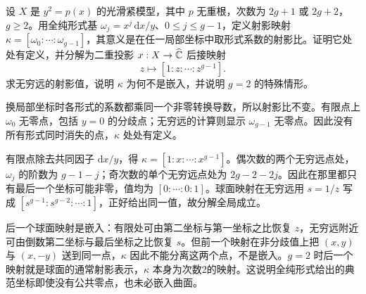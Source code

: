 \begin{exercise}\label{b3:ex:A-4}
设 \(X\) 是 \(y^2=p(x)\) 的光滑紧模型，其中 \(p\) 无重根，次数为 \(2g+1\) 或 \(2g+2\)，\(g\ge2\)。用全纯形式基 \(\omega_j=x^j\,\mathrm{d}x/y\)、\(0\le j\le g-1\)，定义射影映射 \(\kappa=[\omega_0:\cdots:\omega_{g-1}]\)，其意义是在任一局部坐标中取形式系数的射影比。证明它处处有定义，并分解为二重投影 \(x:X\rightarrow\widehat{\mathbb C\kern0pt}\) 后接映射
\[
 z\longmapsto[1:z:\cdots:z^{g-1}].
\]
求无穷远的射影值，说明 \(\kappa\) 为何不是嵌入，并说明 \(g=2\) 的特殊情形。
\end{exercise}
\begin{solution}
换局部坐标时各形式的系数都乘同一个非零转换导数，所以射影比不变。有限点上 \(\omega_0\) 无零点，包括 \(y=0\) 的分歧点；无穷远的计算则显示 \(\omega_{g-1}\) 无零点。因此没有所有形式同时消失的点，\(\kappa\) 处处有定义。

有限点除去共同因子 \(\mathrm{d}x/y\)，得 \(\kappa=[1:x:\cdots:x^{g-1}]\)。偶次数的两个无穷远点处，\(\omega_j\) 的阶数为 \(g-1-j\)；奇次数的单个无穷远点处为 \(2g-2-2j\)。因此在那里都只有最后一个坐标可能非零，值均为 \([0:\cdots:0:1]\)。球面映射在无穷远用 \(s=1/z\) 写成 \([s^{g-1}:s^{g-2}:\cdots:1]\)，正好给出同一值，故分解全局成立。

后一个球面映射是嵌入：有限处可由第二坐标与第一坐标之比恢复 \(z\)，无穷远附近可由倒数第二坐标与最后坐标之比恢复 \(s\)。但前一个映射在非分歧值上把 \((x,y)\) 与 \((x,-y)\) 送到同一点，\(\kappa\) 因此不能分离这两个点，不是嵌入。\(g=2\) 时后一个映射就是球面的通常射影表示，\(\kappa\) 本身为次数2的映射。这说明全纯形式给出的典范坐标即使没有公共零点，也未必嵌入曲面。
\end{solution}

